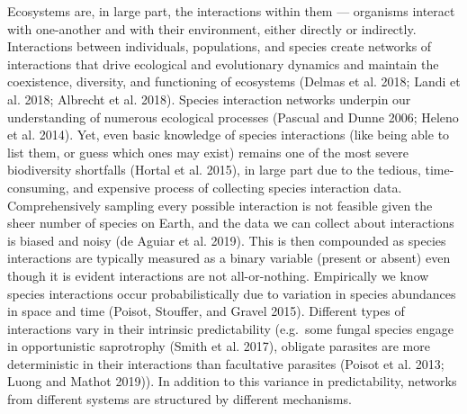 \documentclass[11pt]{article}
\begin{document}
Ecosystems are, in large part, the interactions within them ---
organisms interact with one-another and with their environment, either
directly or indirectly. Interactions between individuals, populations,
and species create networks of interactions that drive ecological and
evolutionary dynamics and maintain the coexistence, diversity, and
functioning of ecosystems (Delmas et al. 2018; Landi et al. 2018;
Albrecht et al. 2018). Species interaction networks underpin our
understanding of numerous ecological processes (Pascual and Dunne 2006;
Heleno et al. 2014). Yet, even basic knowledge of species interactions
(like being able to list them, or guess which ones may exist) remains
one of the most severe biodiversity shortfalls (Hortal et al. 2015), in
large part due to the tedious, time-consuming, and expensive process of
collecting species interaction data. Comprehensively sampling every
possible interaction is not feasible given the sheer number of species
on Earth, and the data we can collect about interactions is biased and
noisy (de Aguiar et al. 2019). This is then compounded as species
interactions are typically measured as a binary variable (present or
absent) even though it is evident interactions are not all-or-nothing.
Empirically we know species interactions occur probabilistically due to
variation in species abundances in space and time (Poisot, Stouffer, and
Gravel 2015). Different types of interactions vary in their intrinsic
predictability (e.g.~some fungal species engage in opportunistic
saprotrophy (Smith et al. 2017), obligate parasites are more
deterministic in their interactions than facultative parasites (Poisot
et al. 2013; Luong and Mathot 2019)). In addition to this variance in
predictability, networks from different systems are structured by
different mechanisms.
\end{document}
